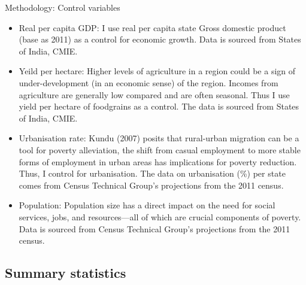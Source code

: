 \documentclass[10pt,aspectratio=169]{beamer}
\begin{document}
\begin{frame}{Methodology: Control variables}
\begin{itemize}
    \item Real per capita GDP: I use real per capita state Gross domestic product (base as 2011) as a control for economic growth. Data is sourced from States of India, CMIE.
    \item Yeild per hectare: Higher levels of agriculture in a region could be a sign of under-development (in an economic sense) of the region. Incomes from agriculture are generally low compared and are often seasonal. Thus I use yield per hectare of foodgrains as a control. The data is sourced from States of India, CMIE.
    \item Urbanisation rate: Kundu (2007) posits that rural-urban migration can be a tool for poverty alleviation, the shift from casual employment to more stable forms of employment in urban areas has implications for poverty reduction. Thus, I control for urbanisation. The data on urbanisation (\%) per state comes from Census Technical Group's projections from the 2011 census.  
    \item Population: Population size has a direct impact on the need for social services, jobs, and resources—all of which are crucial components of poverty. Data is sourced from Census Technical Group's projections from the 2011 census. 
\end{itemize}
\end{frame}

\subsection{Summary statistics}
\end{document}
